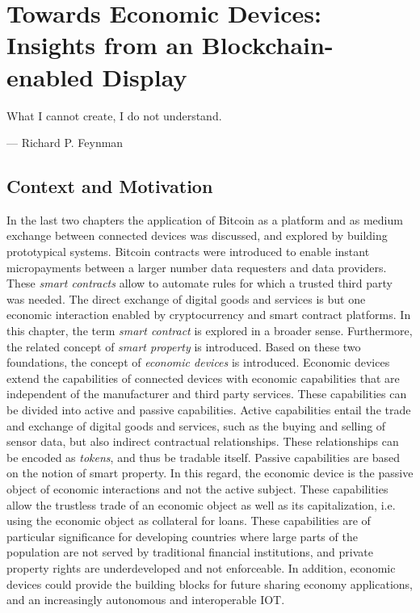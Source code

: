 \chapter{Towards Economic Devices: Insights from an Blockchain-enabled Display}
\label{sec:economicobjects}

\epigraph{What I cannot create, I do not understand.}{--- \textup{Richard P. Feynman}}


\section{Context and Motivation}

In the last two chapters the application of Bitcoin as a platform and as medium exchange between connected devices was discussed, and explored by building prototypical systems. Bitcoin contracts were introduced to enable instant micropayments between a larger number data requesters and data providers. These \emph{smart contracts} allow to automate rules for which a trusted third party was needed. The direct exchange of digital goods and services is but one economic interaction enabled by cryptocurrency and smart contract platforms. In this chapter, the term \emph{smart contract} is explored in a broader sense. Furthermore, the related concept of \emph{smart property} is introduced. Based on these two foundations, the concept of \emph{economic devices} is introduced. Economic devices extend the capabilities of connected devices with economic capabilities that are independent of the manufacturer and third party services. These capabilities can be divided into active and passive capabilities. Active capabilities entail the trade and exchange of digital goods and services, such as the buying and selling of sensor data, but also indirect contractual relationships. These relationships can be encoded as \emph{tokens}, and thus be tradable itself. Passive capabilities are based on the notion of smart property. In this regard, the economic device is the passive object of economic interactions and not the active subject. These capabilities allow the trustless trade of an economic object as well as its capitalization, i.e. using the economic object as collateral for loans. These capabilities are of particular significance for developing countries where large parts of the population are not served by traditional financial institutions, and private property rights are underdeveloped and not enforceable. In addition, economic devices could provide the building blocks for future sharing economy applications, and an increasingly autonomous and interoperable \ac{IOT}.

